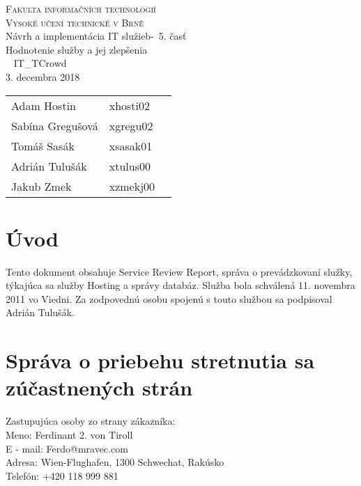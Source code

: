 \documentclass[a4paper, 11pt]{article}
\begin{document}
\begin{center}
\Huge
\textsc{Fakulta informačních technologií\\
Vysoké učení technické v Brně}
\\[84mm]
\LARGE Návrh a implementácia IT služieb\--\ 5. časť\\
\Huge Hodnotenie služby a jej zlepšenia \\\
\vspace{3.5cm}
\LARGE IT\_TCrowd\\
\Large 3. decembra 2018
\end{center}

\hfill

\begin{minipage}[l]{0.6 \textwidth}
\Large
\begin{tabular}{l l l}
Adam Hostin  & xhosti02\\
Sabína Gregušová & xgregu02\\
Tomáš Sasák & xsasak01 \\
Adrián Tulušák  & xtulus00 \\
Jakub Zmek & xzmekj00 \\
\end{tabular}
\end{minipage}
\thispagestyle{empty}
\clearpage

\setcounter{page}{1}

\section*{Úvod}
Tento dokument obsahuje Service Review Report, správa o prevádzkovaní služky, týkajúca sa služby Hosting a správy databáz. Služba bola schválená 11. novembra 2011 vo Viedni. Za zodpovednú osobu spojenú s touto službou sa podpisoval Adrián Tulušák.

\section*{Správa o priebehu stretnutia sa zúčastnených strán}
Zastupujúca osoby zo strany zákazníka:\\
Meno: Ferdinant 2. von Tiroll\\
E - mail: Ferdo@mravec.com\\
Adresa: Wien-Flughafen, 1300 Schwechat, Rakúsko\\
Telefón: +420 118 999 881\\
\end{document}
